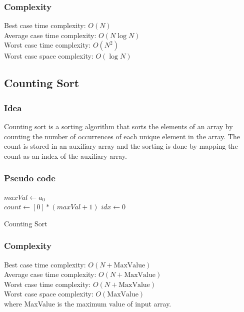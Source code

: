 \documentclass[11pt,a4paper]{article}
\begin{document}
\subsubsection*{Complexity}
Best case time complexity: $O(N)$ \\
Average case time complexity: $O(N \log N)$\\
Worst case time complexity: $O(N^2)$ \\
Worst case space complexity: $O(\log N)$

\subsection{Counting Sort}
\subsubsection*{Idea}
Counting sort is a sorting algorithm that sorts the elements of an array by counting the number of occurrences of each unique element in the array. 
The count is stored in an auxiliary array and the sorting is done by mapping the count as an index of the auxiliary array.

\subsubsection*{Pseudo code}
\begin{algorithm2e}
  \SetAlgoLined
  $maxVal \gets a_0$\\
  $count \gets [0]*(maxVal+1)$ 
  $idx \gets 0$\\
  
  \caption{Counting Sort}
\end{algorithm2e}

\subsubsection*{Complexity}
Best case time complexity: $O(N + \text{MaxValue})$ \\
Average case time complexity: $O(N + \text{MaxValue})$\\
Worst case time complexity: $O(N + \text{MaxValue})$ \\
Worst case space complexity: $O(\text{MaxValue})$\\
where MaxValue is the maximum value of input array.
\end{document}
